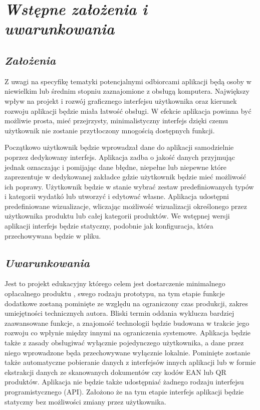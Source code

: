 \documentclass[a4paper,10pt, twoside]{report}
\newcommand{\customstylechapter}[1]{\large{\textit{#1}}}
\newcommand{\customstylesection}[1]{\textbf{\textit{#1}}}
\begin{document}
\chapter{\customstylechapter{Wstępne założenia i uwarunkowania}}
\section{\customstylesection{Założenia}}
{Z uwagi na specyfikę tematyki potencjalnymi odbiorcami aplikacji będą osoby 
w niewielkim lub średnim stopniu zaznajomione z obsługą komputera. Największy
wpływ na projekt i rozwój graficznego interfejsu użytkownika oraz kierunek
 rozwoju aplikacji będzie miała łatwość obsługi. W efekcie aplikacja powinna
 być możliwie prosta, mieć przejrzysty, minimalistyczny interfejs dzięki 
czemu użytkownik nie zostanie przytłoczony mnogością dostępnych funkcji.}

{Początkowo użytkownik będzie wprowadzał dane do aplikacji samodzielnie poprzez 
dedykowany interfejs. Aplikacja zadba o jakość danych przyjmując jednak 
oznaczając i pomijając dane błędne, niepełne lub niepewne które zaprezentuje w 
dedykowanej zakładce gdzie użytkownik będzie mieć możliwość ich poprawy. 
Użytkownik będzie w stanie wybrać zestaw predefiniowanych typów i kategorii 
wydatkó lub utworzyć i edytować własne. Aplikacja udostępni predefiniowane 
wizualizacje, wliczając możliwość wizualizacji określonego przez użytkownika 
produktu lub całej kategorii produktów. We wstępnej wersji aplikacji interfejs
będzie statyczny, podobnie jak konfiguracja, która przechowywana będzie w pliku.}

\section{\customstylesection{Uwarunkowania}}
{Jest to projekt edukacyjny którego celem jest dostarczenie minimalnego
 opłacalnego produktu \cite{MVP}, swego rodzaju prototypu, na tym etapie funkcje
 dodatkowe zostaną pominięte ze względu na ograniczony czas produkcji, zakres
 umiejętności technicznych autora. Bliski termin oddania wyklucza bardziej
 zaawansowane funkcje, a znajomość technologii będzie budowana w trakcie jego
 rozwoju co wpłynie między innymi na ograniczenia systemowe. Aplikacja będzie
 także z zasady obsługiwać wyłącznie pojedynczego użytkownika, a dane przez
 niego wprowadzone będa przechowywane wyłącznie lokalnie. Pominięte zostanie
 także automatyczne pobieranie danych z interfejsów innych aplikacji lub w
 formie ekstrakcji danych ze skanowanych dokumentów czy kodów EAN lub QR
 produktów. Aplikacja nie będzie także udostępniać żadnego rodzaju interfejsu 
programistycznego (API). Założono że na tym etapie interfejs aplikacji będzie statyczny bez
 możliwości zmiany przez użytkownika.}
\end{document}
